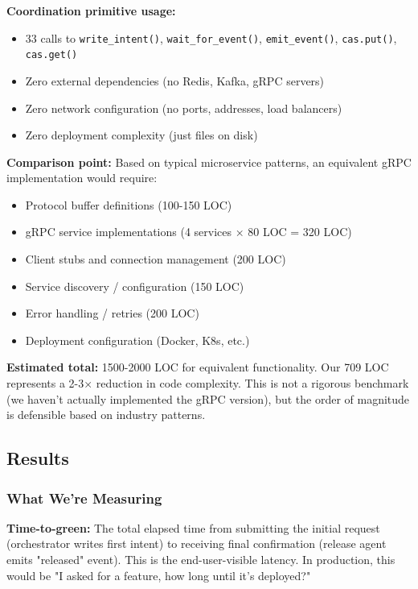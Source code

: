\documentclass[11pt]{article}
\begin{document}
\textbf{Coordination primitive usage:}
\begin{itemize}
\item 33 calls to \texttt{write\_intent()}, \texttt{wait\_for\_event()}, \texttt{emit\_event()}, \texttt{cas.put()}, \texttt{cas.get()}
\item Zero external dependencies (no Redis, Kafka, gRPC servers)
\item Zero network configuration (no ports, addresses, load balancers)
\item Zero deployment complexity (just files on disk)
\end{itemize}

\textbf{Comparison point:} Based on typical microservice patterns, an equivalent gRPC implementation would require:
\begin{itemize}
\item Protocol buffer definitions (100-150 LOC)
\item gRPC service implementations (4 services × 80 LOC = 320 LOC)
\item Client stubs and connection management (200 LOC)
\item Service discovery / configuration (150 LOC)
\item Error handling / retries (200 LOC)
\item Deployment configuration (Docker, K8s, etc.)
\end{itemize}

\textbf{Estimated total:} 1500-2000 LOC for equivalent functionality. Our 709 LOC represents a 2-3× reduction in code complexity. This is not a rigorous benchmark (we haven't actually implemented the gRPC version), but the order of magnitude is defensible based on industry patterns.

\subsection{Results}

\subsubsection{What We're Measuring}

\textbf{Time-to-green:} The total elapsed time from submitting the initial request (orchestrator writes first intent) to receiving final confirmation (release agent emits "released" event). This is the end-user-visible latency. In production, this would be "I asked for a feature, how long until it's deployed?"
\end{document}
